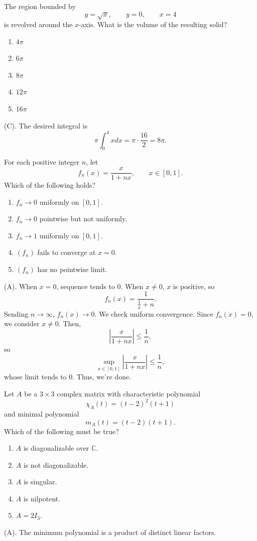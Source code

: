 \begin{exercise}
The region bounded by
\[
y=\sqrt{x},\qquad y=0,\qquad x=4
\]
is revolved around the $x$-axis. What is the volume of the resulting solid?
\begin{enumerate}[label=(\Alph*)]
\item $4\pi$
\item $6\pi$
\item $8\pi$
\item $12\pi$
\item $16\pi$
\end{enumerate}
\end{exercise}
\begin{solution}
(C). The desired integral is 
\[
\pi\int_0^4 x dx = \pi \cdot \frac{16}{2} = 8\pi.
\]
\end{solution}

\begin{exercise}
For each positive integer $n$, let
\[
f_n(x)=\frac{x}{1+nx},
\qquad x\in[0,1].
\]
Which of the following holds?
\begin{enumerate}[label=(\Alph*)]
\item $f_n\to0$ uniformly on $[0,1]$.
\item $f_n\to0$ pointwise but not uniformly.
\item $f_n\to1$ uniformly on $[0,1]$.
\item $(f_n)$ fails to converge at $x=0$.
\item $(f_n)$ has no pointwise limit.
\end{enumerate}
\end{exercise}
\begin{solution}
(A). When $x = 0$, sequence tends to $0$. When $x \neq 0$, $x$ is positive, so
\[
f_n(x) = \frac{1}{\frac{1}{x} + n}.
\] 
Sending $n \rightarrow \infty$, $f_n(x) \rightarrow 0$. We check uniform convergence.
Since $f_n(x) = 0$, we consider $x \neq 0$. Then, 
\[
\left|\frac{x}{1 + nx} \right| \leq \frac{1}{n},
\]
so
\[
\sup_{x \in [0,1]} \left|\frac{x}{1 + nx} \right| \leq \frac{1}{n},
\]
whose limit tends to $0$. Thus, we're done.
\end{solution}

\begin{exercise}
Let $A$ be a $3\times3$ complex matrix
with characteristic polynomial
\[
\chi_A(t)=(t-2)^2(t+1)
\]
and minimal polynomial
\[
m_A(t)=(t-2)(t+1).
\]
Which of the following must be true?
\begin{enumerate}[label=(\Alph*)]
\item $A$ is diagonalizable over $\mathbb C$.
\item $A$ is not diagonalizable.
\item $A$ is singular.
\item $A$ is nilpotent.
\item $A=2I_3$.
\end{enumerate}
\end{exercise}
\begin{solution}
(A). The minimum polynomial is a product of distinct linear factors.
\end{solution}

